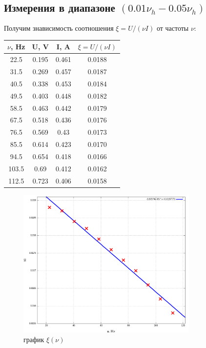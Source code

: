 \documentclass{article}
\begin{document}
\subsection{Измерения в диапазоне \((0.01\nu_h - 0.05\nu_h)\)}
Получим знависимость соотношения \( \xi = U/(\nu I) \) от частоты \(\nu\):
\begin{table}[H]
    \centering
    \begin{tabular}{|c|c|c|c|}
    \hline
    \(\nu\), Hz & U, V  & I, A  & \(\xi = U/(\nu I)\) \\\hline
    22.5 & 0.195 & 0.461 & 0.0188   \\\hline
    31.5 & 0.269 & 0.457 & 0.0187   \\\hline
    40.5 & 0.338 & 0.453 & 0.0184   \\\hline
    49.5 & 0.403 & 0.448 & 0.0182   \\\hline
    58.5 & 0.463 & 0.442 & 0.0179   \\\hline
    67.5 & 0.518 & 0.436 & 0.0176   \\\hline
    76.5 & 0.569 & 0.43  & 0.0173   \\\hline
    85.5 & 0.614 & 0.423 & 0.0170   \\\hline
    94.5 & 0.654 & 0.418 & 0.0166   \\\hline
    103.5& 0.69  & 0.412 & 0.0162   \\\hline
    112.5& 0.723 & 0.406 & 0.0158   \\\hline
    \end{tabular}
\end{table}

\begin{figure}[H]
    \centering
    \includegraphics[width=0.8\textwidth]{1.png}
    \caption{график \( \xi(\nu) \)}
\end{figure}
\end{document}
